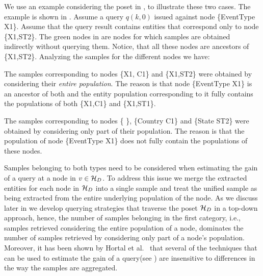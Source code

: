 We use an example considering the poset in , to illustrate these two cases. The example is shown in . Assume a query $q(k,0)$ issued against node \{EventType X1\}. Assume that the query result contains entities that correspond only to node \{X1,ST2\}. The green nodes in  are nodes for which samples are obtained indirectly without querying them. Notice, that all these nodes are ancestors of \{X1,ST2\}. Analyzing the samples for the different nodes we have:
\squishlist
\item The samples corresponding to nodes \{X1, C1\} and \{X1,ST2\} were obtained by considering their {\em entire population}. The reason is that node \{EventType X1\} is an ancestor of both and the entity population corresponding to it fully contains the populations of both \{X1,C1\} and \{X1,ST1\}. 
\item The samples corresponding to nodes \{ \}, \{Country C1\} and \{State ST2\} were obtained by considering only part of their population. The reason is that the population of node \{EventType X1\} does not fully contain the populations of these nodes. 
\squishend

Samples belonging to both types need to be considered when estimating the gain of a query at a node in $v \in \mathcal{H}_D$. To address this issue we merge the extracted entities for each node in $\mathcal{H}_D$ into a single sample and treat the unified sample as being extracted from the entire underlying population of the node. As we discuss later in  we develop querying strategies that traverse the poset $\mathcal{H}_D$ in a top-down approach, hence, the number of samples belonging in the first category, i.e., samples retrieved considering the entire population of a node, dominates the number of samples retrieved by considering only part of a node's population. Moreover, it has been shown by Hortal et al.~\cite{hortal2006evaluating} that several of the techniques that can be used to estimate the gain of a query(see ) are insensitive to differences in the way the samples are aggregated.

